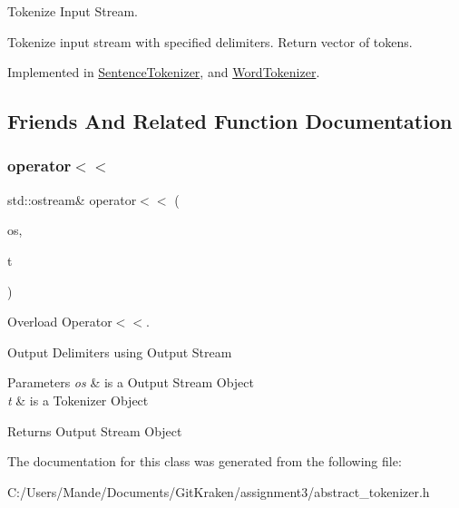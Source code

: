 Tokenize Input Stream. 

Tokenize input stream with specified delimiters. Return vector of tokens. 

Implemented in \hyperlink{class_sentence_tokenizer_a43c1d3f33855c3e5c80cab538cea9224}{Sentence\+Tokenizer}, and \hyperlink{class_word_tokenizer_a1148e1e01de56a7529a39a81a712e04c}{Word\+Tokenizer}.



\subsection{Friends And Related Function Documentation}
\mbox{\label{class_abstract_tokenizer_a5e19d812ca20914a070862e6336c1432}} 
\subsubsection{\texorpdfstring{operator$<$$<$}{operator<<}}
{\footnotesize\ttfamily std\+::ostream\& operator$<$$<$ (\begin{DoxyParamCaption}\item[{std\+::ostream \&}]{os,  }\item[{const \hyperlink{class_abstract_tokenizer}{Abstract\+Tokenizer} \&}]{t }\end{DoxyParamCaption})\hspace{0.3cm}{\ttfamily [friend]}}



Overload Operator$<$$<$. 

Output Delimiters using Output Stream


\begin{DoxyParams}{Parameters}
{\em os} & is a Output Stream Object \\
\hline
{\em t} & is a Tokenizer Object \\
\hline
\end{DoxyParams}
\begin{DoxyReturn}{Returns}
Output Stream Object 
\end{DoxyReturn}


The documentation for this class was generated from the following file\+:\begin{DoxyCompactItemize}
\item 
C\+:/\+Users/\+Mande/\+Documents/\+Git\+Kraken/assignment3/abstract\+\_\+tokenizer.\+h\end{DoxyCompactItemize}
